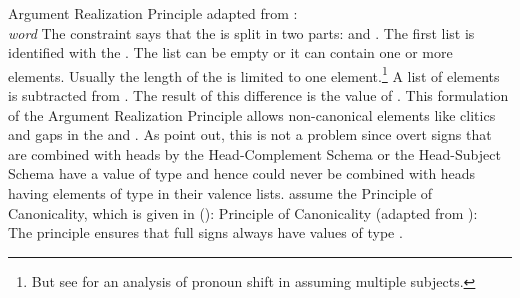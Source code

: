 \documentclass[output=paper,biblatex,babelshorthands,newtxmath,draftmode,colorlinks,citecolor=brown]{langscibook}
\begin{document}
%
\ea\label{ARP} 
Argument Realization Principle adapted from :\\
\emph{word} \impl
{}
\z
The constraint says that the \argstl is split in two parts:  and . The first list is
identified with the \subjl. The list can be empty or it can contain one or more elements. Usually
the length of the \subjl is limited to one element.\footnote{
But see  for an analysis of pronoun shift in  assuming multiple subjects.
} A list of  elements is
subtracted from . The result of this difference is the value of \comps. This formulation of
the Argument Realization Principle allows non-canonical elements like clitics and gaps in the \subj
and \compsl. As \citet[]{GSag2000a-u} point out, this is not a problem since overt signs that are
combined with heads by the Head-Complement Schema or the Head-Subject Schema have a \synsem value of
type  and hence could never be combined with heads having elements of
type  in their valence lists. \citet[]{GSag2000a-u} assume the Principle
of Canonicality, which is given in ():
\ea
Principle of Canonicality (adapted from \citealt[]{GSag2000a-u}):\\
 \impl {}
\z
The principle ensures that full signs always have \synsem values of type .
\end{document}
